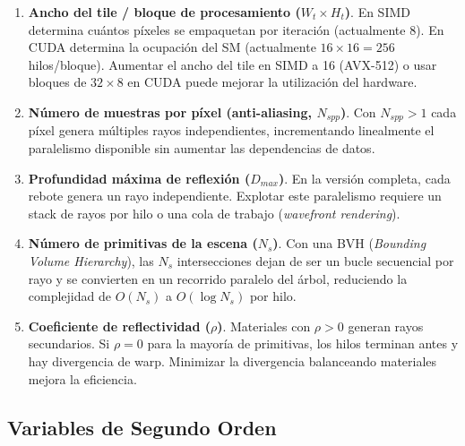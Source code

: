 \documentclass[conference]{IEEEtran}
\begin{document}
\begin{enumerate}

  \item \textbf{Ancho del tile / bloque de procesamiento ($W_t \times H_t$)}.
    En SIMD determina cuántos píxeles se empaquetan por iteración (actualmente 8).
    En CUDA determina la ocupación del SM (actualmente $16\!\times\!16 = 256$ hilos/bloque).
    Aumentar el ancho del tile en SIMD a 16 (AVX-512) o usar bloques de $32\!\times\!8$
    en CUDA puede mejorar la utilización del hardware.

  \item \textbf{Número de muestras por píxel (anti-aliasing, $N_{spp}$)}.
    Con $N_{spp} > 1$ cada píxel genera múltiples rayos independientes, incrementando
    linealmente el paralelismo disponible sin aumentar las dependencias de datos.

  \item \textbf{Profundidad máxima de reflexión ($D_{max}$)}.
    En la versión completa, cada rebote genera un rayo independiente. Explotar este
    paralelismo requiere un stack de rayos por hilo o una cola de trabajo (\textit{wavefront rendering}).

  \item \textbf{Número de primitivas de la escena ($N_s$)}.
    Con una BVH (\textit{Bounding Volume Hierarchy}), las $N_s$ intersecciones dejan de
    ser un bucle secuencial por rayo y se convierten en un recorrido paralelo del árbol,
    reduciendo la complejidad de $O(N_s)$ a $O(\log N_s)$ por hilo.

  \item \textbf{Coeficiente de reflectividad ($\rho$)}.
    Materiales con $\rho > 0$ generan rayos secundarios. Si $\rho = 0$ para la mayoría
    de primitivas, los hilos terminan antes y hay divergencia de warp. Minimizar la
    divergencia balanceando materiales mejora la eficiencia.

\end{enumerate}

\subsection{Variables de Segundo Orden}
\end{document}

